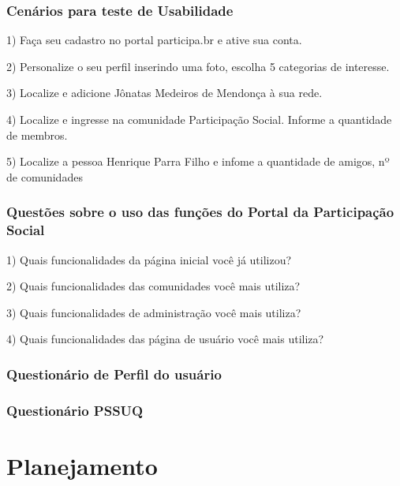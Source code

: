 \subsubsection{Cenários para teste de Usabilidade}

1) Faça seu cadastro no portal participa.br e ative sua conta.

2) Personalize o seu perfil inserindo uma foto, escolha 5 categorias de interesse.

3) Localize e adicione Jônatas Medeiros de Mendonça à sua rede.

4) Localize e ingresse na comunidade Participação Social. Informe a quantidade de membros.

5) Localize a pessoa Henrique Parra Filho e infome a quantidade de amigos, nº de comunidades 

\subsubsection{Questões sobre o uso das funções do Portal da Participação Social}

1) Quais funcionalidades da página inicial você já utilizou?

2) Quais funcionalidades das comunidades você mais utiliza? 

3) Quais funcionalidades de administração você mais utiliza?

4) Quais funcionalidades das página de usuário você mais utiliza? 


\subsubsection{Questionário de Perfil do usuário}


\subsubsection{Questionário PSSUQ}


\section{Planejamento}


